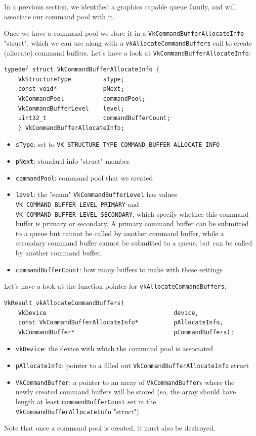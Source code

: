\documentclass[12pt,letterpaper]{article}
\newcommand{\cil}[1]{\texttt{#1}}
\begin{document}
	In a previous section, we identified a graphics capable queue family, and will associate our command pool with it.
	
	Once we have a command pool we store it in a \cil{VkCommandBufferAllocateInfo} "struct", which we can use along with a \cil{vkAllocateCommandBuffers} call to create (allocate) command buffers. Let's have a look at \cil{VkCommandBufferAllocateInfo}:
		\begin{verbatim}
typedef struct VkCommandBufferAllocateInfo {
	VkStructureType         sType;
	const void*             pNext;
	VkCommandPool           commandPool;
	VkCommandBufferLevel    level;
	uint32_t                commandBufferCount;
	} VkCommandBufferAllocateInfo;
		\end{verbatim}
		\begin{itemize}
			\item \cil{sType}: set to \cil{VK_STRUCTURE_TYPE_COMMAND_BUFFER_ALLOCATE_INFO}
			
			\item \cil{pNext}: standard info "struct" member
			
			\item \cil{commandPool}: command pool that we created
			
			\item \cil{level}: the "enum" \cil{VkCommandBufferLevel} has values \cil{VK_COMMAND_BUFFER_LEVEL_PRIMARY} and \cil{VK_COMMAND_BUFFER_LEVEL_SECONDARY}, which specify whether this command buffer is primary or secondary. A primary command buffer can be submitted to a queue but cannot be called by another command buffer, while a secondary command buffer cannot be submitted to a queue, but can be called by another command buffer. 
			
			\item \cil{commandBufferCount}: how many buffers to make with these settings
		\end{itemize}
	Let's have a look at the function pointer for \cil{vkAllocateCommandBuffers}:
		\begin{verbatim}
VkResult vkAllocateCommandBuffers(
	VkDevice                                    device,
	const VkCommandBufferAllocateInfo*          pAllocateInfo,
	VkCommandBuffer*                            pCommandBuffers);
		\end{verbatim}
		\begin{itemize}
			\item \cil{vkDevice}: the device with which the command pool is associated
			
			\item \cil{pAllocateInfo}: pointer to a filled out \cil{VkCommandBufferAllocateInfo} struct
			
			\item \cil{VkCommandBuffer}: a pointer to an array of \cil{VkCommandBuffer}s where the newly created command buffers will be stored (so, the array should have length at least \cil{commandBufferCount} set in the \cil{VkCommandBufferAllocateInfo} "struct")
		\end{itemize}
	Note that once a command pool is created, it must also be destroyed.
	
\end{document}
